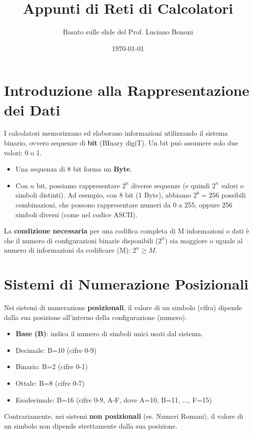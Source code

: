 

\title{Appunti di Reti di Calcolatori}
\author{Basato sulle slide del Prof. Luciano Bononi}
\date{\today}



\maketitle
\tableofcontents
\newpage

\section{Introduzione alla Rappresentazione dei Dati}
I calcolatori memorizzano ed elaborano informazioni utilizzando il sistema binario, ovvero sequenze di \textbf{bit} (BInary digiT). Un bit può assumere solo due valori: 0 o 1.
\begin{itemize}
    \item Una sequenza di 8 bit forma un \textbf{Byte}.
    \item Con $n$ bit, possiamo rappresentare $2^n$ diverse sequenze (e quindi $2^n$ valori o simboli distinti). Ad esempio, con 8 bit (1 Byte), abbiamo $2^8 = 256$ possibili combinazioni, che possono rappresentare numeri da 0 a 255, oppure 256 simboli diversi (come nel codice ASCII).
\end{itemize}
La \textbf{condizione necessaria} per una codifica completa di M informazioni o dati è che il numero di configurazioni binarie disponibili ($2^n$) sia maggiore o uguale al numero di informazioni da codificare (M): $2^n \ge M$.

\section{Sistemi di Numerazione Posizionali}
Nei sistemi di numerazione \textbf{posizionali}, il valore di un simbolo (cifra) dipende dalla sua posizione all'interno della configurazione (numero).
\begin{itemize}
    \item \textbf{Base (B)}: indica il numero di simboli unici usati dal sistema.
    \item Decimale: B=10 (cifre 0-9)
    \item Binario: B=2 (cifre 0-1)
    \item Ottale: B=8 (cifre 0-7)
    \item Esadecimale: B=16 (cifre 0-9, A-F, dove A=10, B=11, ..., F=15)
\end{itemize}
Contrariamente, nei sistemi \textbf{non posizionali} (es. Numeri Romani), il valore di un simbolo non dipende strettamente dalla sua posizione.

